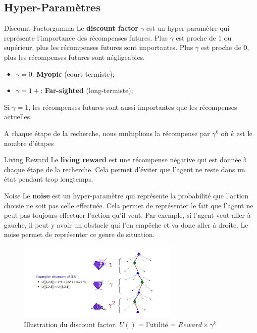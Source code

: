 \subsection{Hyper-Paramètres} %
\label{sub:hyper_parametres}

\begin{definition}{Discount Factor}{gamma}
    Le \textbf{discount factor} $\gamma$ est un hyper-paramètre qui représente l'importance des récompenses futures. 
    Plus $\gamma$ est proche de 1 ou supérieur, plus les récompenses futures sont importantes.
    Plus $\gamma$ est proche de 0, plus les récompenses futures sont négligeables. 
    \begin{itemize}
        \item $\gamma = 0$: \textbf{Myopic} (court-termiste);
        \item $\gamma = 1+$: \textbf{Far-sighted} (long-termiste);
    \end{itemize}  
    Si $\gamma = 1$, les récompenses futures sont aussi importantes que les récompenses actuelles.

    A chaque étape de la recherche, nous multiplions la récompense par $\gamma^k$ où $k$ est le nombre d'étapes
\end{definition}

\begin{definition}{Living Reward}{}
    Le \textbf{living reward} est une récompense négative qui est donnée à chaque étape de la recherche. 
    Cela permet d'éviter que l'agent ne reste dans un état pendant trop longtemps.
\end{definition}

\begin{definition}{Noise}{}
    Le \textbf{noise} est un hyper-paramètre qui représente la probabilité que l'action choisie ne soit pas celle effectuée. 
    Cela permet de représenter le fait que l'agent ne peut pas toujours effectuer l'action qu'il veut. 
    Par exemple, si l'agent veut aller à gauche, il peut y avoir un obstacle qui l'en empêche et va donc aller à droite.
    Le noise permet de représenter ce genre de situation.
\end{definition}

\begin{figure}[H]
    \centering
    \includegraphics[width=0.7\textwidth]{../pictures/discountfac.png}
    \caption{Illustration du discount factor. $U()$ = l'utilité = $Reward \times \gamma^k$}\label{fig:discountfac}
\end{figure}

